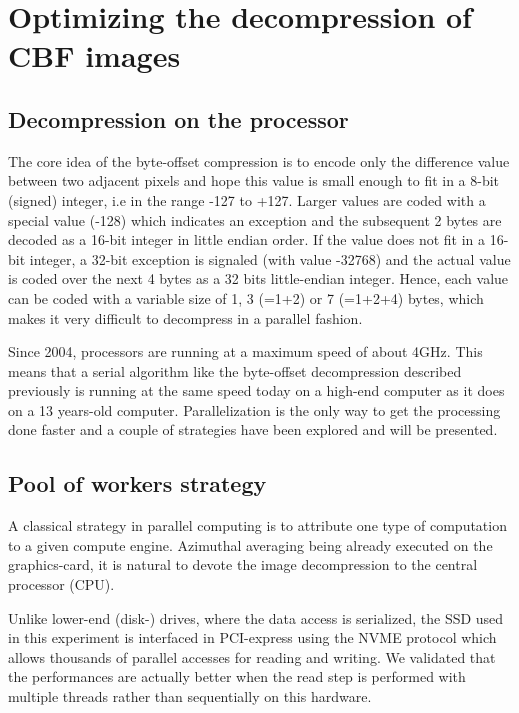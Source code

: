 \documentclass[preprint]{iucr}              %
\begin{document}
\section{Optimizing the decompression of CBF images}

\subsection{Decompression on the processor}

The core idea of the byte-offset compression is to encode only the difference
value between two adjacent pixels and hope this value is small enough to fit in
a 8-bit (signed) integer, i.e in the range -127 to +127.
Larger values are coded with a special value (-128) which indicates an exception
and the subsequent 2 bytes are decoded as a 16-bit integer in little endian
order.
If the value does not fit in a 16-bit integer, a 32-bit exception is
signaled (with value -32768) and the actual value is coded over the next 4 bytes
as a 32 bits little-endian integer.
Hence, each value can be coded with a variable size of 1, 3 (=1+2) or 7 (=1+2+4)
bytes, which makes it very difficult to decompress in a parallel fashion.

Since 2004, processors are running at a maximum speed of about 4GHz.
This means that a serial algorithm like the byte-offset decompression described
previously is running at the same speed today on a high-end computer as it
does on a 13 years-old computer.
Parallelization is the only way to get the processing done faster and a couple
of strategies have been explored and will be presented.

\subsection{Pool of workers strategy} 

A classical strategy in parallel computing is to attribute one type of
computation to a given compute engine.
Azimuthal averaging being already executed on the graphics-card, it is natural
to devote the image decompression to the central processor (CPU).

Unlike lower-end (disk-) drives, where the data access is serialized,
the SSD used in this experiment is interfaced in PCI-express using the NVME
protocol \cite{nvme} which allows thousands of parallel accesses for reading and
writing.
We validated that the performances are actually better when the read step is
performed with multiple threads rather than sequentially on this hardware.
\end{document}
